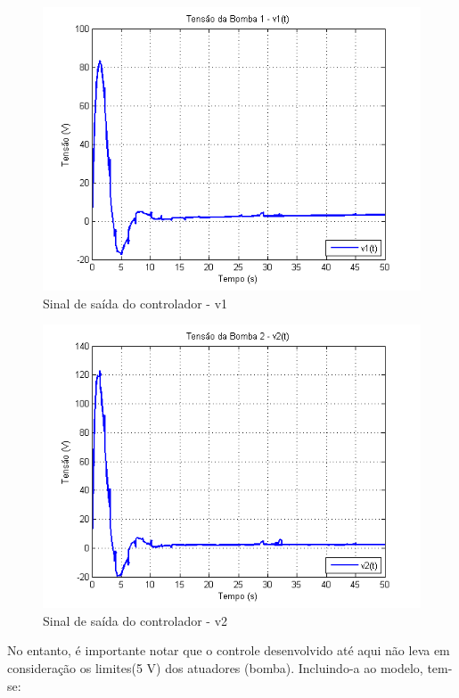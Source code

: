 \begin{figure}[H]
	\centering
	\includegraphics[height=0.35\paperheight ,keepaspectratio]{img/fm_u1_free.png}
	\caption{\small Sinal de saída do controlador - v1 }
	\label{figFm_u1_free}
\end{figure}

\begin{figure}[H]
	\centering
	\includegraphics[height=0.35\paperheight ,keepaspectratio]{img/fm_u2_free.png}
	\caption{Sinal de saída do controlador - v2 }
	\label{figFm_u2_free}
\end{figure}

No entanto, é importante notar que o controle desenvolvido até aqui não leva em consideração os limites(5 V) dos atuadores (bomba). Incluindo-a ao modelo, tem-se:

